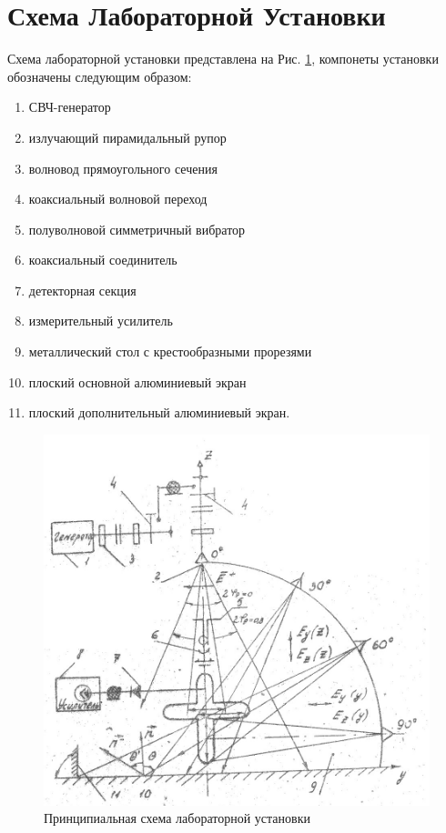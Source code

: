 \documentclass[11pt,a4paper,oneside, reqno]{amsproc}
\begin{document}
\section{Схема Лабораторной Установки}
Схема лабораторной установки представлена на Рис. \ref{fig:scheme},
компонеты установки обозначены следующим образом:
\begin{enumerate}
    \item СВЧ-генератор
    \item излучающий пирамидальный рупор
    \item волновод прямоугольного сечения
    \item коаксиальный волновой переход
    \item полуволновой симметричный вибратор
    \item коаксиальный соединитель
    \item детекторная секция
    \item измерительный усилитель
    \item металлический стол с крестообразными прорезями
    \item плоский основной алюминиевый экран
    \item плоский дополнительный алюминиевый экран.
\end{enumerate}

\begin{figure}[h!]
    \begin{center}
        \includegraphics[width=\textwidth]{scheme.jpg}
    \end{center}
    \vspace{-20pt}
    \caption{Принципиальная схема лабораторной установки}
    \label{fig:scheme}
\end{figure}
\end{document}
